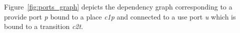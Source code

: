 Figure~\ref{fig:ports_graph} depicts the dependency graph corresponding to a
provide port \emph{p} bound to a place \emph{c1p} and connected to
a use port \emph{u} which is bound to a transition \emph{c2t}.







